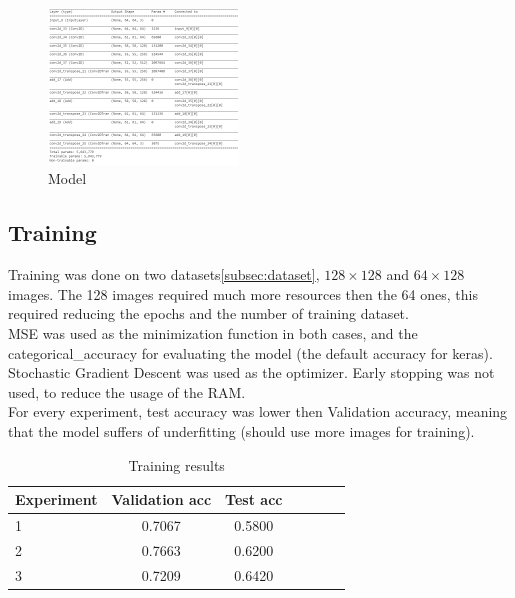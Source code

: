 \documentclass[twocolumn,showpacs,%
  nofootinbib,aps,superscriptaddress,%
  eqsecnum,prd,notitlepage,showkeys,10pt]{revtex4-1}
\begin{document}
\begin{figure}[H]
    \includegraphics[width=0.45\textwidth]{images/model.PNG}
    \caption{\label{fig:noise}Model}
\end{figure}
\subsection{Training}
Training was done on two datasets\ref{subsec:dataset}, $128\times128$ and $64\times128$ images. The 128 images required much more resources then the 64 ones, this required reducing the epochs and the number of training dataset.\\
MSE was used as the minimization function in both cases, and the categorical\_accuracy for evaluating the model (the default accuracy for keras).\\
Stochastic Gradient Descent was used as the optimizer. Early stopping was not used, to reduce the usage of the RAM.\\
For every experiment, test accuracy was lower then Validation accuracy, meaning that the model suffers of underfitting (should use more images for training). 

\begin{table}[H] \label{tab:training}
    \centering
    \begin{tabular}{l|c|c|c|c|c|c}
    Experiment       &  Validation acc & Test acc \\\hline
    1          &  0.7067           & 0.5800            \\\hline
    2          &  0.7663        &   0.6200            \\\hline
    3          &  0.7209              &0.6420         
    \end{tabular}
    \caption{\label{tab:widgets}Training results}
    \end{table}
\end{document}
